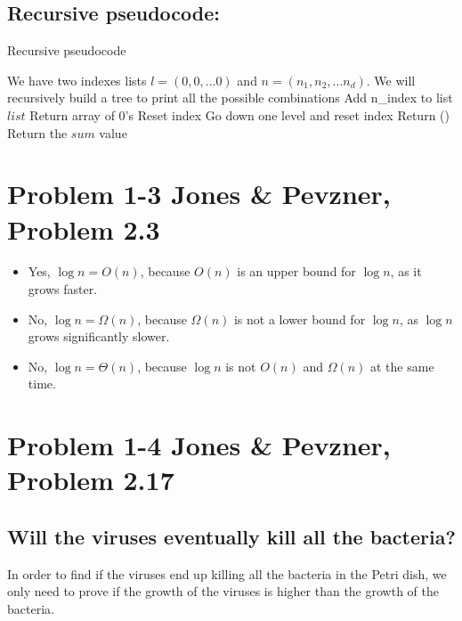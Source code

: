 \documentclass{article}
\begin{document}
\subsection*{Recursive pseudocode:}
\begin{algorithm}[H]
\caption{Recursive pseudocode}
\begin{algorithmic}[1]
\State We have two indexes lists $l = (0,0,...0)$ and $n = (n_1,n_2,...n_d)$.
\State We will recursively build a tree to print all the possible combinations
 \State Add n_index to list $list$
  \State Return array of 0's
 \EndIf
  \State Reset index
 \EndIf
  \State Go down one level and reset index
 \EndIf
{}
\State Return ()
\EndFunction
\State Return the $sum$ value
\end{algorithmic}
\end{algorithm}

\section*{Problem 1-3 Jones \& Pevzner, Problem 2.3}

\begin{itemize}

\item Yes, $\log n = O(n)$, because $O(n)$ is an upper bound for $\log n$, as it grows faster.

\item No, $\log n = \Omega(n)$, because $\Omega(n)$ is not a lower bound for $\log n$, as $\log n$ grows significantly slower.

\item No, $\log n = \Theta(n)$, because $\log n$ is not $O(n)$ and $\Omega(n)$ at the same time.

\end{itemize}

\section*{Problem 1-4 Jones \& Pevzner, Problem 2.17}

\subsection*{Will the viruses eventually kill all the bacteria?}
In order to find if the viruses end up killing all the bacteria in the Petri dish, we only need to prove if the growth of the viruses is higher than the growth of the bacteria.
\end{document}
